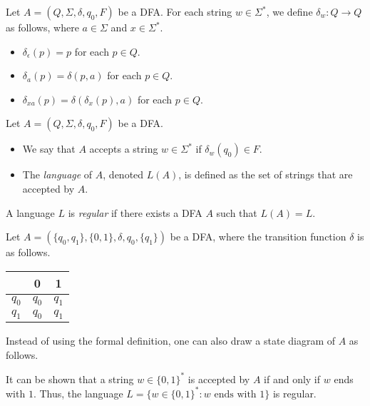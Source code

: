 \begin{definition}
  Let $A = (Q, \Sigma, \delta, q_0, F)$ be a DFA.
  For each string $w \in \Sigma^*$, we define $\delta_w: Q \to Q$ as follows,
  where $a \in \Sigma$ and $x \in \Sigma^*$.
  \begin{itemize}
    \item $\delta_\epsilon(p) = p$ for each $p \in Q$.
    \item $\delta_a(p) = \delta(p, a)$ for each $p \in Q$.
    \item $\delta_{xa}(p) = \delta(\delta_x(p), a)$ for each $p \in Q$.
  \end{itemize}
\end{definition}

\begin{definition}
  Let $A = (Q, \Sigma, \delta, q_0, F)$ be a DFA.
  \begin{itemize}
    \item We say that $A$ accepts a string $w \in \Sigma^*$ if
    $\delta_w(q_0) \in F$.
    \item The \emph{language} of $A$, denoted $L(A)$, is defined as the set of
    strings that are accepted by $A$.
  \end{itemize}
\end{definition}

\begin{definition}
  A language $L$ is \emph{regular} if there exists a DFA $A$ such that
  $L(A) = L$.
\end{definition}

\begin{example}
  Let $A = (\{q_0, q_1\}, \{0, 1\}, \delta, q_0, \{q_1\})$ be a DFA, where the
  transition function $\delta$ is as follows.
  \begin{center}
    \begin{tabular}{c|cc}
      & 0 & 1 \\
      \hline
      $q_0$ & $q_0$ & $q_1$ \\
      $q_1$ & $q_0$ & $q_1$
    \end{tabular}
  \end{center}
  Instead of using the formal definition, one can also draw a state diagram of
  $A$ as follows.
  \begin{center}
  \end{center}
  It can be shown that a string $w \in \{0, 1\}^*$ is accepted by $A$ if and
  only if $w$ ends with $1$.
  Thus, the language $L = \{w \in \{0, 1\}^* : \text{$w$ ends with 1} \}$
  is regular.
\end{example}

